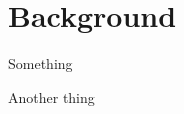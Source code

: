 \section{Background}

\begin{frame}
  Something
\end{frame}

\begin{frame}
  Another thing
\end{frame}
